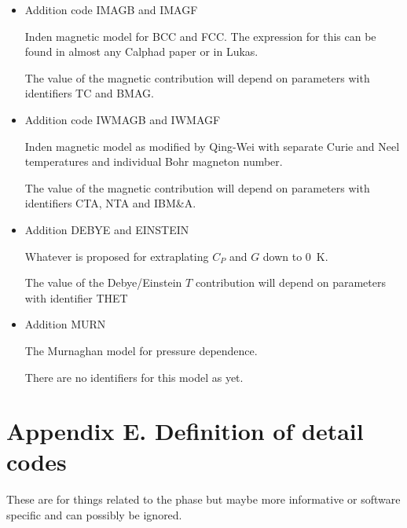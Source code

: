 \documentclass[12pt]{article}
\begin{document}
\begin{itemize}
\item Addition code IMAGB and IMAGF

  Inden magnetic model for BCC and FCC.  The expression for this can
  be found in almost any Calphad paper or in Lukas\cite{07Luk}.

  The value of the magnetic contribution will depend on parameters
  with identifiers TC and BMAG.

\item Addition code IWMAGB and IWMAGF

  Inden magnetic model as modified by Qing-Wei with separate Curie and
  Neel temperatures and individual Bohr magneton number.\cite{13Wei}

  The value of the magnetic contribution will depend on parameters
  with identifiers CTA, NTA and IBM\&A.

\item Addition DEBYE and EINSTEIN

  Whatever is proposed for extraplating $C_P$ and $G$ down to 0~K.

  The value of the Debye/Einstein $T$ contribution will depend on parameters
  with identifier THET

\item Addition MURN

  The Murnaghan model for pressure dependence.

  There are no identifiers for this model as yet.

\end{itemize}

\newpage

\section{Appendix E.  Definition of detail codes}

These are for things related to the phase but maybe more informative
or software specific and can possibly be ignored.
\end{document}
